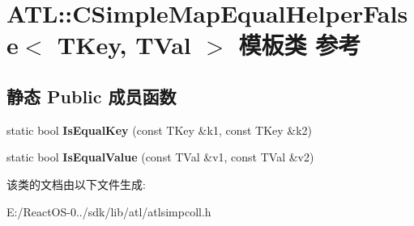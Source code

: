 \hypertarget{class_a_t_l_1_1_c_simple_map_equal_helper_false}{}\section{A\+TL\+:\+:C\+Simple\+Map\+Equal\+Helper\+False$<$ T\+Key, T\+Val $>$ 模板类 参考}
\label{class_a_t_l_1_1_c_simple_map_equal_helper_false}
\subsection*{静态 Public 成员函数}
\begin{DoxyCompactItemize}
\item 
\mbox{\label{class_a_t_l_1_1_c_simple_map_equal_helper_false_a4da24a2d732e7c9b977cd36a4894b13e}} 
static bool {\bfseries Is\+Equal\+Key} (const T\+Key \&k1, const T\+Key \&k2)
\item 
\mbox{\label{class_a_t_l_1_1_c_simple_map_equal_helper_false_a95561d12ee7353b04920bc72157e93f5}} 
static bool {\bfseries Is\+Equal\+Value} (const T\+Val \&v1, const T\+Val \&v2)
\end{DoxyCompactItemize}


该类的文档由以下文件生成\+:\begin{DoxyCompactItemize}
\item 
E\+:/\+React\+O\+S-\/0../sdk/lib/atl/atlsimpcoll.\+h\end{DoxyCompactItemize}
